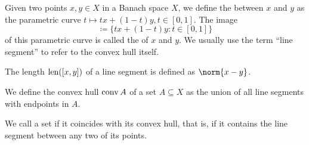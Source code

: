 \begin{definition}\label{def:convex_set}\mbox{}
  \begin{defenum}
     Given two points \( x, y \in X \) in a Banach space \( X \), we define the  between \( x \) and \( y \) as the parametric curve \( t \mapsto tx + (1-t)y, t \in [0, 1] \). The image
    \begin{equation*}
      [x, y] \coloneqq \{ tx + (1-t)y \colon t \in [0, 1] \}
    \end{equation*}
    of this parametric curve is called the  of \( x \) and \( y \). We usually use the term \enquote{line segment} to refer to the convex hull itself.

    The length \( \operatorname{len}([x, y]) \) of a line segment is defined as \( \norm{x - y} \).

     We define the convex hull \( \operatorname{conv} A \) of a set \( A \subseteq X \) as the union of all line segments with endpoints in \( A \).

     We call a set  if it coincides with its convex hull, that is, if it contains the line segment between any two of its points.
  \end{defenum}
\end{definition}

